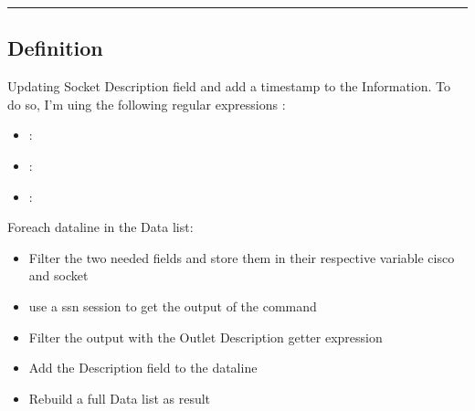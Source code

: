 \documentclass[letterpaper,10pt,english]{sphinxmanual}
\begin{document}
\bigskip\hrule\bigskip



\subsection{Definition}
\label{\detokenize{OUP/get_Description:definition}}
\sphinxAtStartPar
Updating Socket Description field and add a timestamp to the Information.
To do so, I’m uing the following regular expressions :
\begin{itemize}
\item {} 
\sphinxAtStartPar
{} : 

\item {} 
\sphinxAtStartPar
{} : \sphinxstylestrong{{[}NRJPASEP{]}+{[}0\sphinxhyphen{}9{]}+{[}A\sphinxhyphen{}K{]}{[}0\sphinxhyphen{}9{]}+\sphinxhyphen{}{[}0\sphinxhyphen{}9{]}+}

\item {} 
\sphinxAtStartPar
{} : 

\end{itemize}

\sphinxAtStartPar
Foreach dataline in the Data list:
\begin{itemize}
\item {} 
\sphinxAtStartPar
Filter the two needed fields and store them in their respective variable cisco and socket

\item {} 
\sphinxAtStartPar
use a ssn session to get the output of the command 

\item {} 
\sphinxAtStartPar
Filter the output with the Outlet Description getter expression

\item {} 
\sphinxAtStartPar
Add the Description field to the dataline

\item {} 
\sphinxAtStartPar
Rebuild a full Data list as result

\end{itemize}
\end{document}

